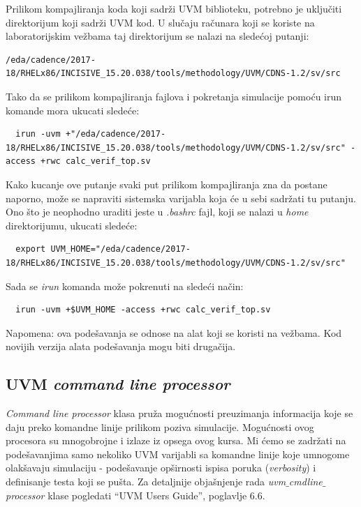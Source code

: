 Prilikom kompajliranja koda koji sadrži UVM biblioteku, potrebno je uključiti
direktorijum koji sadrži UVM kod. U slučaju računara koji se koriste na laboratorijskim
vežbama taj direktorijum se nalazi na sledećoj putanji:
\begin{lstlisting}
/eda/cadence/2017-18/RHELx86/INCISIVE_15.20.038/tools/methodology/UVM/CDNS-1.2/sv/src
\end{lstlisting}
Tako da se prilikom kompajliranja fajlova i pokretanja simulacije pomoću irun komande mora ukucati
sledeće:
\begin{lstlisting}
  irun -uvm +"/eda/cadence/2017-18/RHELx86/INCISIVE_15.20.038/tools/methodology/UVM/CDNS-1.2/sv/src" -access +rwc calc_verif_top.sv
\end{lstlisting}

Kako kucanje ove putanje svaki put prilikom kompajliranja zna da postane naporno,
može se napraviti sistemska varijabla koja će u sebi sadržati tu putanju. Ono što je neophodno uraditi
jeste u \emph{.bashrc} fajl, koji se nalazi u \emph{home} direktorijumu, ukucati sledeće:
\begin{lstlisting}
  export UVM_HOME="/eda/cadence/2017-18/RHELx86/INCISIVE_15.20.038/tools/methodology/UVM/CDNS-1.2/sv/src"
\end{lstlisting}
Sada se \emph{irun} komanda može pokrenuti na sledeći način:
\begin{lstlisting}
  irun -uvm +$UVM_HOME -access +rwc calc_verif_top.sv
\end{lstlisting}




Napomena: ova podešavanja se odnose na alat koji se koristi na vežbama.
Kod novijih verzija alata podešavanja mogu biti drugačija.


\subsection{UVM \emph{command line processor}}

\emph{Command line processor} klasa pruža mogućnosti preuzimanja informacija
koje se daju preko komandne linije prilikom poziva simulacije. Mogućnosti ovog
procesora su mnogobrojne i izlaze iz opsega ovog kursa. Mi ćemo se zadržati na
podešavanjima samo nekoliko UVM varijabli sa komandne linije koje umnogome
olakšavaju simulaciju - podešavanje opširnosti ispisa poruka (\emph{verbosity})
i definisanje testa koji se pušta. Za detaljnije objašnjenje rada
\emph{uvm\(\_\)cmdline\(\_\)processor} klase pogledati ``UVM Users Guide'',
poglavlje 6.6.\\

